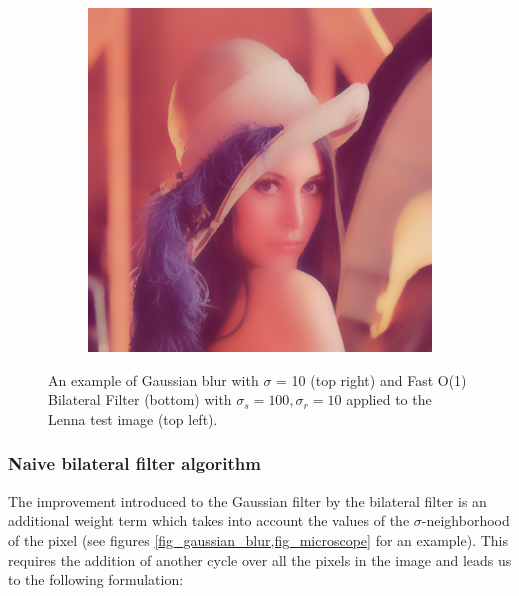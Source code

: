 \documentclass [12pt,a4paper]{report}
\begin{document}
\begin{figure}[h]
\begin{subfigure}{.5\textwidth}
\end{subfigure}
\\
\\
\begin{subfigure}{1.0\textwidth}
  \centering
  \includegraphics[scale=0.73]{Lenna_bf_100_10.eps} %
\end{subfigure}
\caption{An example of Gaussian blur with $\sigma$ = 10 (top right) and Fast O(1) Bilateral Filter (bottom) with $\sigma_s=100, \sigma_r=10$ applied to the Lenna test image (top left)\cite{lenna}.}
\label{fig_gaussian_blur}
\end{figure}

\subsubsection{Naive bilateral filter algorithm}

The improvement introduced to the Gaussian filter by the bilateral filter is an additional weight term which takes into account the values of the $\sigma$-neighborhood of the pixel (see figures \ref{fig_gaussian_blur,fig_microscope} for an example). This requires the addition of another cycle over all the pixels in the image and leads us to the following formulation:
\end{document}
